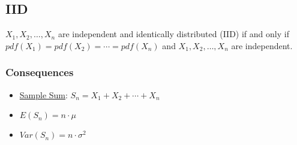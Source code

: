 \documentclass[12pt]{article}
\begin{document}
        \subsection{IID}
            $X_1, X_2, \ldots, X_n$ are independent and identically distributed (IID) 
            if and only if $pdf(X_1) = pdf(X_2) = \cdots = pdf(X_n)$ and $X_1, X_2, \ldots, X_n$ are independent.
            \subsubsection{Consequences}
                \begin{itemize}
                    \item \underline{Sample Sum}: $S_n = X_1 + X_2 + \cdots + X_n$
                    \item $E(S_n) = n \cdot \mu$
                    \item $Var(S_n) = n \cdot \sigma^2$
                \end{itemize}
\end{document}
